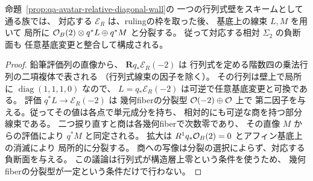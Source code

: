 \begin{corollary}[分裂壁上の相対射影束の分裂]
\label{cor:qa-avatar-relative-scroll-splitting}
命題~\ref{prop:qa-avatar-relative-diagonal-wall}の
一つの行列式壁をスキームとして通る族では、
対応する $\mathcal E_R$ は、rulingの枠を取った後、
基底上の線束 $L,M$ を用いて
局所に $\mathcal O_B(2)\otimes q^*L\oplus q^*M$ と分裂する。
従って対応する相対 $\Sigma_2$ の負断面も
任意基底変更と整合して構成される。
\end{corollary}
\begin{proof}
鉛筆評価列の直像から、
$\mathbf Rq_*\mathcal E_R(-2)$ は
行列式を定める階数四の乗法行列の二項複体で表される
（行列式線束の因子を除く）。
その行列は壁上で局所に $\operatorname{diag}(1,1,1,0)$ なので、
$L=q_*\mathcal E_R(-2)$ は可逆で任意基底変更と可換である。
評価 $q^* L\to\mathcal E_R(-2)$ は
幾何fiberの分裂型 $\mathcal O(-2)\oplus\mathcal O$ 上で
第二因子を与える。従ってその値は各点で単元成分を持ち、
相対的にも可逆な商を持つ部分線束である。
二つ捩り直すと商は各幾何fiberで次数零であり、
その直像 $M$ からの評価により $q^*M$ と同定される。
拡大は $R^1q_*\mathcal O_B(2)=0$ とアフィン基底上の消滅により
局所的に分裂する。
商への写像は分裂の選択によらず、対応する負断面を与える。
この議論は行列式が構造層上零という条件を使うため、
幾何fiberの分裂型が一定という条件だけで行わない。
\end{proof}

